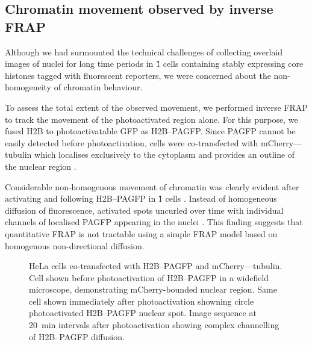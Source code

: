     \subsection{Chromatin movement observed by inverse FRAP}

    Although we had surmounted the technical challenges of collecting
    overlaid images of nuclei for long time periods
    in \G1{} cells containing stably expressing
    core histones tagged with fluorescent reporters,
    we were concerned about the non-homogeneity of chromatin behaviour.

    To assess the total extent of the observed movement,
    we performed inverse FRAP
    to track the movement of the photoactivated region alone.
    For this purpose, we fused H2B to photoactivatable GFP as H2B--PAGFP.
    Since PAGFP cannot be easily detected before photoactivation,
    cells were co-transfected with mCherry--\textalpha--tubulin
    which localises exclusively to the cytoplasm
    and provides an outline of the nuclear region
    .

    Considerable non-homogenous movement of chromatin was clearly evident
    after activating and following H2B--PAGFP in
    \G1{} cells .
    Instead of homogeneous diffusion of fluorescence,
    activated spots uncurled over time with individual channels of
    localised PAGFP appearing in the nuclei .
    This finding suggests that quantitative FRAP is not tractable using
    a simple FRAP model based on homogenous non-directional diffusion.

    \begin{figure}
      \centering
      \hfill
        {
          HeLa cells co-transfected with H2B--PAGFP and
          mCherry--\textalpha--tubulin.
          Cell shown before photoactivation of H2B--PAGFP
          in a widefield microscope, demonstrating
          mCherry-bounded nuclear region.
          Same cell shown immediately after photoactivation
          showning circle photoactivated H2B--PAGFP nuclear spot.
          Image sequence at 20~min intervals
          after photoactivation showing complex
          channelling of H2B--PAGFP diffusion.
        }
      \label{fig:kill-frap:ifrap}
    \end{figure}

